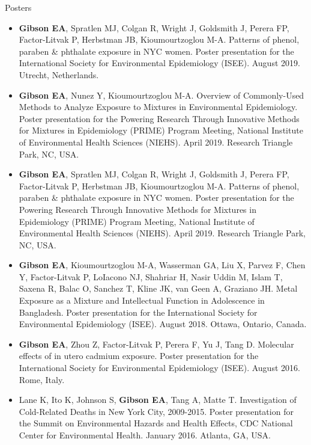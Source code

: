 \documentclass[a4paper,10pt]{article}
\newlength{\cvcolumngapwidth}
\newlength{\cvleftcolumnwidth}
\newlength{\cvrightcolumnwidth}
\newcommand{\cvdurationstyle}[1]{{\small\cvdurationfont\textcolor{cvdurationcolor}{#1}}}
\newlength{\cvafteritemskipamount}
\newlength{\cvparskip}
\newcommand{\cvitem}[2]{
    \begin{minipage}[t]{\cvleftcolumnwidth}
        \raggedleft #1
    \end{minipage}%
    \hspace{\cvcolumngapwidth}%
    \begin{minipage}[t]{\cvrightcolumnwidth}
        \setlength{\parskip}{\cvparskip} #2
    \end{minipage}

    \vspace{\cvafteritemskipamount}
}
\begin{document}
\cvitem{
    \cvdurationstyle{Posters}
}{  
    \begin{itemize}[leftmargin=*]
   	 \item \textbf{Gibson EA}, Spratlen MJ, Colgan R, Wright J, Goldsmith J, Perera FP, Factor-Litvak P, Herbstman JB, Kioumourtzoglou M-A. Patterns of phenol, paraben \& phthalate exposure in NYC women. Poster presentation for the International Society for Environmental Epidemiology (ISEE). August 2019. Utrecht, Netherlands. \\
\vspace{.5mm}
	\item \textbf{Gibson EA}, Nunez Y, Kioumourtzoglou M-A. Overview of Commonly-Used Methods to Analyze Exposure to Mixtures in Environmental Epidemiology. Poster presentation for the Powering Research Through Innovative Methods for Mixtures in Epidemiology (PRIME) Program Meeting, National Institute of Environmental Health Sciences (NIEHS). April 2019. Research Triangle Park, NC, USA. \\
\vspace{.5mm}
	\item \textbf{Gibson EA}, Spratlen MJ, Colgan R, Wright J, Goldsmith J, Perera FP, Factor-Litvak P, Herbstman JB, Kioumourtzoglou M-A. Patterns of phenol, paraben \& phthalate exposure in NYC women. Poster presentation for the Powering Research Through Innovative Methods for Mixtures in Epidemiology (PRIME) Program Meeting, National Institute of Environmental Health Sciences (NIEHS). April 2019. Research Triangle Park, NC, USA. \\
\vspace{.5mm}
    	\item \textbf{Gibson EA}, Kioumourtzoglou M-A, Wasserman GA, Liu X, Parvez F, Chen Y, Factor-Litvak P, LoIacono NJ, Shahriar H, Nasir Uddin M, Islam T, Saxena R, Balac O, Sanchez T, Kline JK, van Geen A, Graziano JH. Metal Exposure as a Mixture and Intellectual Function in Adolescence in Bangladesh. Poster presentation for the International Society for Environmental Epidemiology (ISEE). August 2018. Ottawa, Ontario, Canada. \\
\vspace{.5mm}
	\item \textbf{Gibson EA}, Zhou Z, Factor-Litvak P, Perera F, Yu J, Tang D. Molecular effects of in utero cadmium exposure. Poster presentation for the International Society for Environmental Epidemiology (ISEE). August 2016. Rome, Italy. \\  
\vspace{.5mm}
	\item Lane K, Ito K, Johnson S, \textbf{Gibson EA}, Tang A, Matte T. Investigation of Cold-Related Deaths in New York City, 2009-2015. Poster presentation for the Summit on Environmental Hazards and Health Effects, CDC National Center for Environmental Health. January 2016. Atlanta, GA, USA. \\
    \end{itemize}
}
\end{document}
